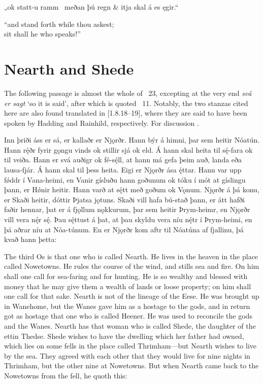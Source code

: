 \bvg\bva „ok statt-u ramm \hld\ meðan þú regn &
\ind {}itja skal á es ęgir.“\eva

\bvb “and stand forth while thou askest; \\
sit shall he who speaks!”\evb\evg

\sectionline

\section{Nearth and Shede}

The following passage is almost the whole of \Gylfaginning\ 23, excepting at the very end \emph{svá er sagt} ‘so it is said’, after which is quoted \Grimnismal\ 11.
Notably, the two stanzas cited here are also found translated in \textcite{Saxo}[1.8.18--19], where they are said to have been spoken by Hadding and Rainhild, respectively.  For discussion \textcite{Hopkins2021}.

\sectionline

\bpg\bpa Inn þriði áss er sá, er kallaðr er Njǫrðr. Hann býr á himni, þar sem heitir Nóatún. Hann rę́ðr fyrir gǫngu vinds ok stillir sjá ok eld. Á hann skal heita til sę́-fara ok til veiða. Hann er svá auðigr ok fé-sę́ll, at hann má gefa þeim auð, landa eða lausa-fjár. Á hann skal til þess heita. Eigi er Njǫrðr ása ę́ttar. Hann var upp fǿddr í Vana-heimi, en Vanir gísluðu hann goðunum ok tóku í mót at gíslingu þann, er Hǿnir heitir. Hann varð at sę́tt með goðum ok Vǫnum. Njǫrðr á þá konu, er Skaði heitir, dóttir Þjatsa jǫtuns. Skaði vill hafa bú-stað þann, er átt hafði faðir hennar, þat er á fjǫllum nǫkkurum, þar sem heitir Þrym-heimr, en Njǫrðr vill vera nę́r sę́. Þau sę́ttust á þat, at þau skyldu vera níu nę́tr í Þrym-heimi, en þá aðrar níu at Nóa-túnum. En er Njǫrðr kom aftr til Nóatúna af fjallinu, þá kvað hann þetta:\epa

\bpb The third Os is that one who is called Nearth. He lives in the heaven in the place called Nowetowns. He rules the course of the wind, and stills sea and fire. On him shall one call for sea-faring and for hunting. He is so wealthy and blessed with money that he may give them a wealth of lands or loose property; on him shall one call for that sake. Nearth is not of the lineage of the Eese. He was brought up in Wanehome, but the Wanes gave him as a hostage to the gods, and in return got as hostage that one who is called Heener. He was used to reconcile the gods and the Wanes. Nearth has that woman who is called Shede, the daughter of the ettin Thedse. Shede wishes to have the dwelling which her father had owned, which lies on some fells in the place called Thrimham—but Nearth wishes to live by the sea. They agreed with each other that they would live for nine nights in Thrimham, but the other nine at Nowetowns. But when Nearth came back to the Nowetowns from the fell, he quoth this:\epb\epg

